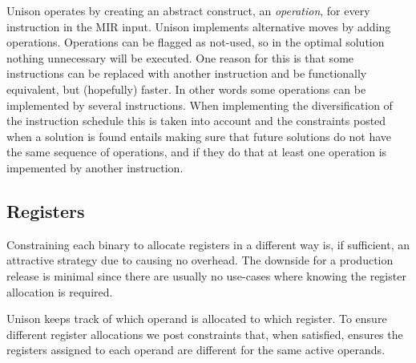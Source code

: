 Unison operates by creating an abstract construct, an \textit{operation}, for every instruction
in the MIR input. Unison implements alternative moves by adding operations. Operations can
be flagged as not-used, so in the optimal solution nothing unnecessary will be executed. 
One reason for this is that some instructions can be replaced with another instruction and
be functionally equivalent, but (hopefully) faster. In other words some operations can be
implemented by several instructions. When implementing the diversification of the 
instruction schedule this is taken into account and the constraints posted when a solution
is found entails making sure that future solutions do not have the same sequence of
operations, and if they do that at least one operation is impemented by another instruction.

\subsection{Registers}

Constraining each binary to allocate registers in a different way is, if sufficient, an
attractive strategy due to causing no overhead. The downside for a production release is
minimal since there are usually no use-cases where knowing the register allocation is required.

Unison keeps track of which operand is allocated to which register. To ensure different
register allocations we post constraints that, when satisfied, ensures the registers assigned
to each operand are different for the same active operands.
